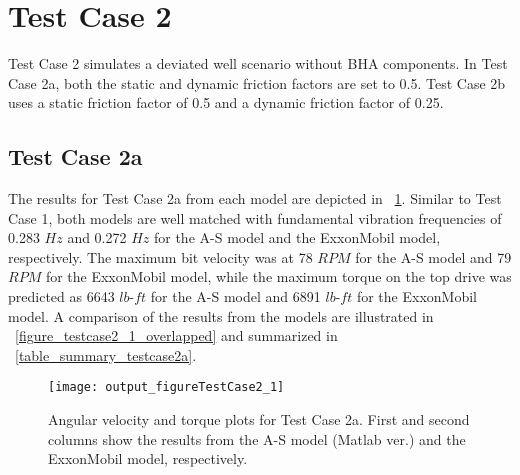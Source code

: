 \section{Test Case 2}
Test Case 2 simulates a deviated well scenario without BHA components. In Test Case 2a, both the static and dynamic friction factors are set to 0.5. Test Case 2b uses a static friction factor of 0.5 and a dynamic friction factor of 0.25.

\subsection{Test Case 2a}
The results for Test Case 2a from each model are depicted in \figurename~\ref{figure_testcase2_1}. Similar to Test Case 1, both models are well matched with fundamental vibration frequencies of 0.283 $Hz$ and 0.272 $Hz$ for the A-S model and the ExxonMobil model, respectively. The maximum bit velocity was at 78 $RPM$ for the A-S model and 79 $RPM$ for the ExxonMobil model, while the maximum torque on the top drive was predicted as 6643 $lb\mbox{-}ft$ for the A-S model and 6891 $lb\mbox{-}ft$ for the ExxonMobil model. A comparison of the results from the models are illustrated in \figurename~\ref{figure_testcase2_1_overlapped} and summarized in \tablename~\ref{table_summary_testcase2a}.
\begin{figure}
  \centering
  \texttt{[image: output\_figureTestCase2\_1]}
  \caption[Angular velocity and torque plots for Test Case 2a]{Angular velocity and torque plots for Test Case 2a. First and second columns show the results from the A-S model (Matlab ver.) and the ExxonMobil model, respectively.}\label{figure_testcase2_1}
\end{figure}


